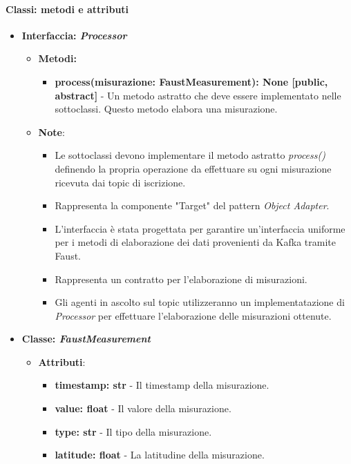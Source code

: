 \paragraph*{Classi: metodi e attributi}
\begin{itemize}
    \item{\textbf{Interfaccia: \textit{Processor}}}
    \begin{itemize}
    \item\textbf{Metodi: }
    \begin{itemize}
        \item \textbf{process(misurazione: FaustMeasurement): None [public, abstract]} - Un metodo astratto che deve essere implementato nelle sottoclassi. Questo metodo elabora una misurazione.
    \end{itemize}
    \item\textbf{Note}:
        \begin{itemize}
            \item  Le sottoclassi devono implementare il metodo astratto \textit{process()} definendo la propria operazione da effettuare su ogni misurazione ricevuta dai topic di iscrizione.
            \item Rappresenta la componente "Target" del pattern \textit{Object Adapter}.
            \item L'interfaccia è stata progettata per garantire un'interfaccia uniforme per i metodi di elaborazione dei dati provenienti da Kafka tramite Faust.
            \item Rappresenta un contratto per l'elaborazione di misurazioni.
            \item Gli agenti in ascolto sul topic utilizzeranno un implementatazione di \textit{Processor} per effettuare l'elaborazione delle misurazioni ottenute.
        \end{itemize}
    \end{itemize}
    \item{\textbf{Classe: \textit{FaustMeasurement}}}
    \begin{itemize}
    \item\textbf{Attributi}:
        \begin{itemize}
        \item \textbf{timestamp: str} - Il timestamp della misurazione.
        \item \textbf{value: float} - Il valore della misurazione.
        \item \textbf{type: str} - Il tipo della misurazione.
        \item \textbf{latitude: float} - La latitudine della misurazione.

\end{itemize}
\end{itemize}
\end{itemize}
